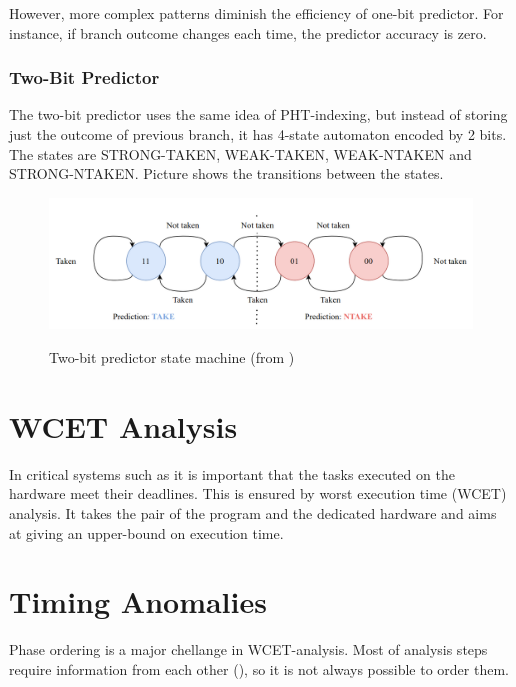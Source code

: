 However, more complex patterns diminish the efficiency of one-bit predictor. For instance, if branch outcome changes each time, the predictor accuracy is zero.

\subsubsection{Two-Bit Predictor}

The two-bit predictor uses the same idea of PHT-indexing, but instead of storing just the outcome of previous branch, it has 4-state automaton encoded by 2 bits. The states are STRONG-TAKEN, WEAK-TAKEN, WEAK-NTAKEN and STRONG-NTAKEN. Picture \TODO{} shows the transitions between the states.

\begin{figure}
    \includegraphics[width=\textwidth]{figures/two-bit-counter.png}
    \label{fig:two-bit-counter}
    \caption{Two-bit predictor state machine (from \cite{mahling_reverse_2023})}
\end{figure}




\section{WCET Analysis}

In critical systems such as  it is important that the tasks executed on the hardware meet their deadlines. This is ensured by worst execution time (WCET) analysis. It takes the pair of the program and the dedicated hardware and aims at giving an upper-bound on execution time. 


\section{Timing Anomalies}

Phase ordering is a major chellange in WCET-analysis. Most of analysis steps require information from each other (), so it is not always possible to order them. 

